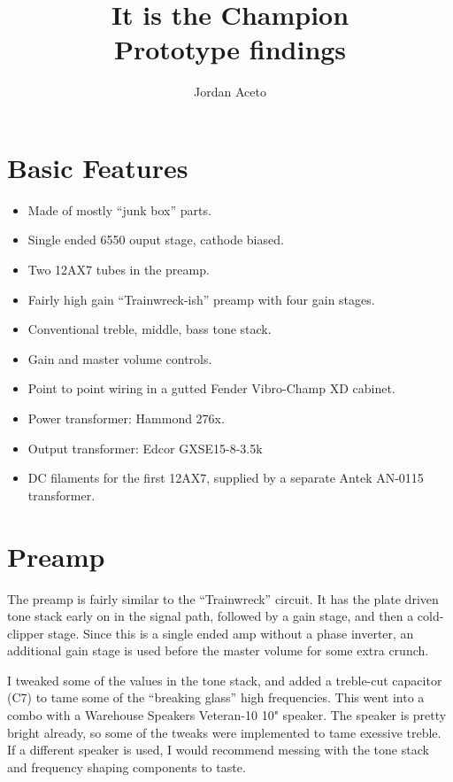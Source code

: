 \documentclass[pdftex,letterpaper,11pt]{article}
\title{%
	It is the Champion \\
	\large Prototype findings}
\author{Jordan Aceto}
\begin{document}
\maketitle

\tableofcontents

\newpage

\section{Basic Features}

\begin{itemize}
\item Made of mostly ``junk box'' parts.
\item Single ended 6550 ouput stage, cathode biased.
\item Two 12AX7 tubes in the preamp.
\item Fairly high gain ``Trainwreck-ish'' preamp with four gain stages.
\item Conventional treble, middle, bass tone stack.
\item Gain and master volume controls.
\item Point to point wiring in a gutted Fender Vibro-Champ XD cabinet.
\item Power transformer: Hammond 276x.
\item Output transformer: Edcor GXSE15-8-3.5k
\item DC filaments for the first 12AX7, supplied by a separate Antek AN-0115 transformer.
\end{itemize}

\newpage

\section{Preamp}

The preamp is fairly similar to the ``Trainwreck'' circuit. It has the plate driven tone stack early on in the signal path, followed by a gain stage, and then a cold-clipper stage. Since this is a single ended amp without a phase inverter, an additional gain stage is used before the master volume for some extra crunch.

I tweaked some of the values in the tone stack, and added a treble-cut capacitor (C7) to tame some of the ``breaking glass'' high frequencies. This went into a combo with a Warehouse Speakers Veteran-10 10" speaker. The speaker is pretty bright already, so some of the tweaks were implemented to tame exessive treble. If a different speaker is used, I would recommend messing with the tone stack and frequency shaping components to taste.
\end{document}
